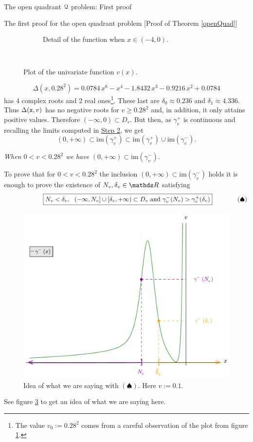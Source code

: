 \documentclass[11pt, a4paper, english, twoside, notitlepage, openright]{report}
\begin{document}
\begin{chapter}{The open quadrant $\mathcal{Q}$ problem: First proof}
\begin{section}{The first proof for the open quadrant problem} [Proof of Theorem \ref{openQuad}]
\begin{figure}[h]
\begin{subfigure}{.5\linewidth}
\caption{Detail of the function when $x\in(-4,0)$.\label{fig:uveDetail}}
\end{subfigure}\\[1ex]
\caption{Plot of the univariate function $v(x)$.\label{fig:v(x)}}
\end{figure}
$$
\Delta(x,0.28^2)=0.0784\,x^{6}-x^{4}-1.8432\,x^{3}-0.9216\,x^{2}+0.0784
$$ 
has 4 complex roots and 2 real ones\footnote{The value $v_0:=0.28^2$ comes from a careful observation of the plot from figure \ref{fig:uveDetail}.}. These last are $\delta_0\approx 0.236$ and $\delta_1\approx 4.336$. Thus $\Delta({\tt x},v)$ has no negative roots for $v\ge 0.28^2$ and, in addition, it only attains positive values. Therefore $(-\infty,0)\subset D_v$. But then, as $\gamma_v^+$ is continuous and recalling the limits computed in \hyperref[step2]{Step 2}, we get  
$$
(0,+\infty)\subset\text{im}(\gamma_v^+)\subset\text{im}(\gamma_v^+)\cup\text{im}(\gamma_v^-).
$$
\begin{center}
 \emph{When $0<v<0.28^2$ we have} $(0,+\infty)\subset\text{im}(\gamma_v^-)$.
\end{center}
\label{step4}
To prove that for $0<v<0.28^2$ the inclusion $(0,+\infty)\subset\text{im}(\gamma_v^-)$ holds it is enough to prove the existence of $N_v,\delta_v\in\R$ satisfying			
\begin{equation*}\qquad \quad
\qquad\quad\boxed{N_v<\delta_v,\ \ (-\infty,N_v]\cup[\delta_v,+\infty)\subset D_v\text{ and } \gamma_v^-(N_v)>\gamma_v^+(\delta_v)\\
}\qquad \qquad (\spadesuit)
\end{equation*}
\begin{figure}[h]
\centering
\includegraphics[width=1\textwidth]{plots/ch1_12_idea.pdf}
\caption{Idea of what we are saying with $(\spadesuit)$. Here $v:=0.1$.\label{fig:idea}}
\end{figure}
See figure \ref{fig:idea} to get an idea of what we are saying here. 


\end{section}
\end{chapter}
\end{document}
